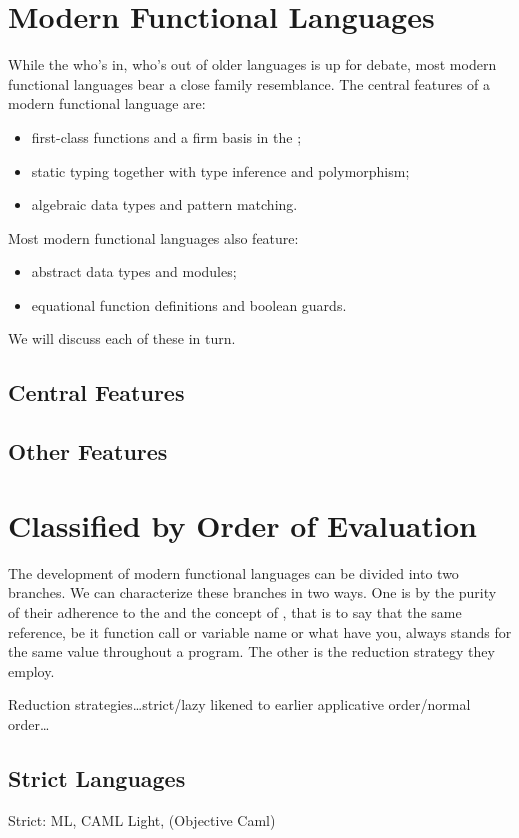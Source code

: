 \section{Modern Functional Languages}
While the who's in, who's out of older languages is up for debate, most modern functional languages bear a close family resemblance. The central features of a modern functional language are:
\begin{itemize}
\item
first-class functions and a firm basis in the \lambdacalc;
\item
static typing together with type inference and polymorphism;
\item
algebraic data types and pattern matching.
\end{itemize}
Most modern functional languages also feature:
\begin{itemize}
\item
abstract data types and modules;
\item
equational function definitions and boolean guards.
\end{itemize}
We will discuss each of these in turn.

\subsection{Central Features}
\subsection{Other Features}

\section{Classified by Order of Evaluation}
The development of modern functional languages can be divided into two branches. We can characterize these branches in two ways. One is by the purity of their adherence to the \lambdacalc and the concept of , that is to say that the same reference, be it function call or variable name or what have you, always stands for the same value throughout a program. The other is the reduction strategy they employ.

Reduction strategies\dots strict/lazy likened to earlier applicative order/normal order\dots

\subsection{Strict Languages}
Strict: ML, CAML Light, (Objective Caml)

